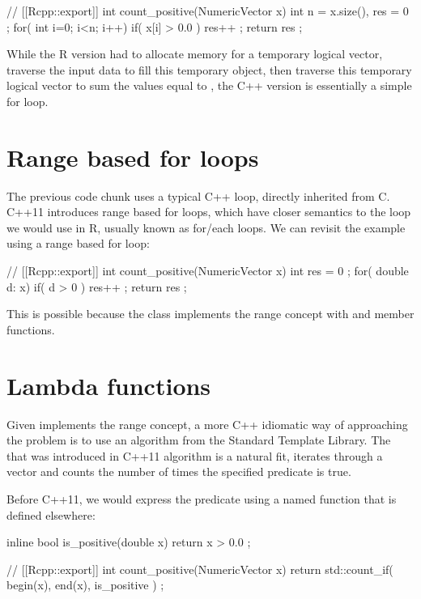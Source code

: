 \begin{example}
// [[Rcpp::export]]
int count_positive(NumericVector x){
  int n = x.size(), res = 0 ;
  for( int i=0; i<n; i++) if( x[i] > 0.0 ) res++ ;
  return res ;
}
\end{example}

While the R version had to allocate memory for a temporary logical 
vector, traverse the input data to fill this temporary object, then 
traverse this temporary logical vector to sum the values equal to , 
the C++ version is essentially a simple for loop. 

\section{Range based for loops}

The previous code chunk uses a typical C++  loop, directly 
inherited from C. C++11 introduces range based for loops, which have 
closer semantics to the loop we would use in R, usually known as
for/each loops. We can revisit the example using a range based for loop:

\begin{example}
// [[Rcpp::export]]
int count_positive(NumericVector x){
  int res = 0 ;
  for( double d: x){
    if( d > 0 ) res++ ;
  }
  return res ;
}
\end{example}

This is possible because the  class implements 
the range concept with  and  member functions. 

\section{Lambda functions}

Given  implements the range concept, a more C++ idiomatic
way of approaching the problem is to use an algorithm from the Standard
Template Library. The  that was introduced
in C++11 algorithm is a natural fit,  iterates through a vector
and counts the number of times the specified predicate is true. 

Before C++11, we would express the predicate using a named function that is defined
elsewhere: 

\begin{example}
inline bool is_positive(double x){
  return x > 0.0 ;
}

// [[Rcpp::export]]
int count_positive(NumericVector x){
  return std::count_if( begin(x), end(x), is_positive ) ;
}
\end{example}

